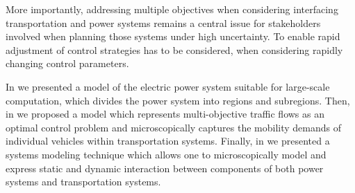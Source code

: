 
More importantly, addressing multiple objectives when considering interfacing transportation and power systems remains a central issue for stakeholders involved when planning those systems under high uncertainty. 
To enable rapid adjustment of control strategies has to be considered, when considering rapidly changing control parameters.



In \cite{Hackenberg2012} we presented a model of the electric power system suitable for large-scale computation, which divides the power system into regions and subregions.
Then, in \cite{ascher2014early} we proposed a model which represents multi-objective traffic flows as an optimal control problem and microscopically captures the mobility demands of individual vehicles within transportation systems.
Finally, in \cite{ascher2015integrated} we presented a systems modeling technique which allows one to microscopically model and express static and dynamic interaction between components of both power systems and transportation systems.


